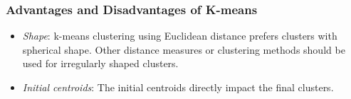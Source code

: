 \documentclass[10pt,dvipsnames]{beamer}
\begin{document}
\begin{frame}
    \frametitle{Advantages and Disadvantages of K-means}
    \begin{itemize}
        \item \textit{Shape}: k-means clustering using Euclidean distance prefers clusters with spherical shape. Other distance measures or clustering methods should be used for irregularly shaped clusters.
        \item \textit{Initial centroids}: The initial centroids directly impact the final clusters.
    \end{itemize}
\end{frame}
\end{document}
